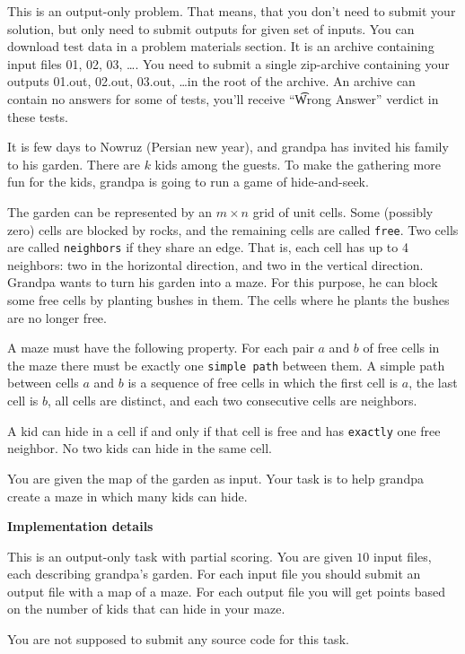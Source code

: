 This is an output-only problem. That means, that you don't need to submit your solution, but only need to submit outputs for given set of inputs. You can download test data in a problem materials section. It is an archive containing input files 01, 02, 03, \dots. You need to submit a single zip-archive containing your outputs 01.out, 02.out, 03.out, \dots in the root of the archive.  An archive can contain no answers for some of tests, you'll receive ``\t{Wrong Answer}'' verdict in these tests.

It is few days to Nowruz (Persian new year), and grandpa has invited his family to his garden. There are $k$ kids among the guests. To make the gathering more fun for the kids, grandpa is going to run a game of hide-and-seek.

The garden can be represented by an $m \times n$ grid of unit cells. Some (possibly zero) cells are blocked by rocks, and the remaining cells are called \texttt{free}. Two cells are called \texttt{neighbors} if they share an edge. That is, each cell has up to 4 neighbors: two in the horizontal direction, and two in the vertical direction. Grandpa wants to turn his garden into a maze. For this purpose, he can block some free cells by planting bushes in them. The cells where he plants the bushes are no longer free.

A maze must have the following property. For each pair $a$ and $b$ of free cells in the maze there must be exactly one \texttt{simple path} between them. A simple path between cells $a$ and $b$ is a sequence of free cells in which the first cell is $a$, the last cell is $b$, all cells are distinct, and each two consecutive cells
are neighbors.

A kid can hide in a cell if and only if that cell is free and has \texttt{exactly} one free neighbor. No two kids can hide in the same cell.

You are given the map of the garden as input. Your task is to help grandpa create a maze in which many kids can hide.

\textbf{Implementation details}

This is an output-only task with partial scoring. You are given $10$ input files, each describing grandpa's garden. For each input file you should submit an output file with a map of a maze. For each output file you will get points based on the number of kids that can hide in your maze.

You are not supposed to submit any source code for this task.




